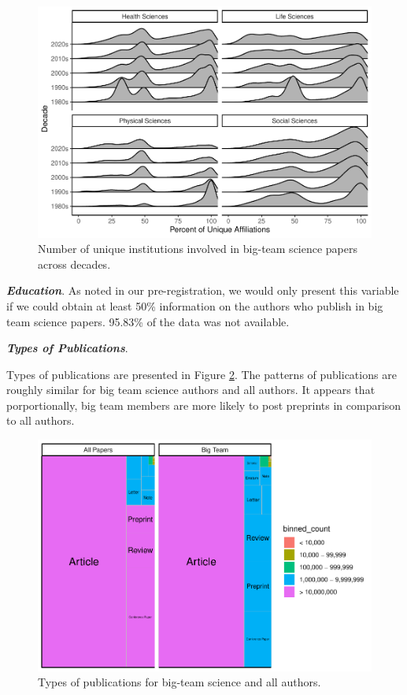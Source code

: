 \documentclass[
  man,floatsintext]{apa6}
\begin{document}
\begin{figure}
\centering
\includegraphics{manuscript_scopus_files/figure-latex/fig-inst-1.pdf}
\caption{\label{fig:fig-inst}Number of unique institutions involved in big-team science papers across decades.}
\end{figure}

\textbf{\emph{Education}}. As noted in our pre-registration, we would only present this variable if we could obtain at least 50\% information on the authors who publish in big team science papers. 95.83\% of the data was not available.

\textbf{\emph{Types of Publications}}.

Types of publications are presented in Figure \ref{fig:fig-pub-types}. The patterns of publications are roughly similar for big team science authors and all authors. It appears that porportionally, big team members are more likely to post preprints in comparison to all authors.

\begin{figure}
\centering
\includegraphics{manuscript_scopus_files/figure-latex/fig-pub-types-1.pdf}
\caption{\label{fig:fig-pub-types}Types of publications for big-team science and all authors.}
\end{figure}
\end{document}
